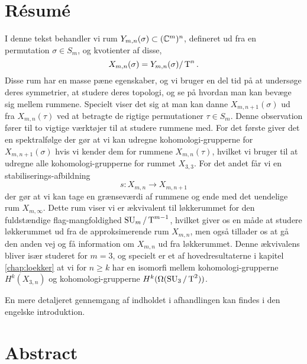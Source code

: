 
\chapter{Résumé}

I denne tekst behandler vi rum $Y_{m,n}(\sigma)\subset (\mathbb{C}^m)^n$,
defineret ud fra
en permutation $\sigma\in S_m$, og
kvotienter af disse,
\[ X_{m,n}(\sigma) = Y_{m,n}(\sigma) /\operatorname{T}^n. \]
Disse rum har en masse pæne egenskaber, og vi bruger en del tid på at
undersøge deres symmetrier, at studere deres topologi, og se på hvordan
man kan bevæge sig mellem
rummene. Specielt viser det sig at man kan danne $X_{m,n+1}(\sigma)$ ud
fra $X_{m,n}(\tau)$ ved at betragte de rigtige permutationer
$\tau\in S_m$. Denne observation fører til to vigtige værktøjer til at
studere rummene med. For det første giver det en spektralfølge der gør
at vi kan udregne
kohomologi-grupperne for $X_{m,n+1}(\sigma)$ hvis vi kender dem for
rummene $X_{m,n}(\tau)$, hvilket vi bruger til at udregne alle
kohomologi-grupperne for rummet $X_{3,3}$. For det andet får vi en
stabiliserings-afbildning
\[ s : X_{m,n} \to X_{m,n+1} \]
der gør at vi kan tage en grænseværdi af rummene og ende med det
uendelige rum $X_{m,\infty}$. Dette rum viser vi er ækvivalent til
løkkerummet for den fuldstændige flag-mangfoldighed $\operatorname{SU}_{m}/\operatorname{T}^{m-1}$, hvilket
giver os en måde at studere løkkerummet ud fra de approksimerende rum
$X_{m,n}$, men også tillader os at gå den anden vej og få information
om $X_{m,n}$ ud fra løkkerummet. Denne ækvivalens bliver især
studeret for $m = 3$, og specielt er et af hovedresultaterne i
kapitel \ref{chap:loekker} at vi for $n \geq k$ har en isomorfi mellem
kohomologi-grupperne $H^k(X_{3,n})$ og kohomologi-grupperne
$H^k(\Omega(\operatorname{SU}_3/\operatorname{T}^2))$.

En mere detaljeret gennemgang af indholdet i afhandlingen kan
findes i den engelske introduktion.

\chapter{Abstract}


